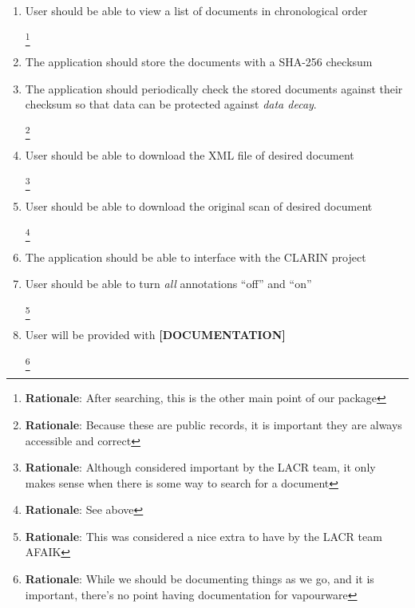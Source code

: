 \documentclass[10pt,a4paper]{report}
\newcommand{\rationale}[1]{
    \footnote{
        \textbf{Rationale}: #1
    }
}
\begin{document}
\begin{enumerate}
            \item User should be able to view a list of documents in chronological order 
            \rationale{After searching, this is the other main point of our package}
            
            \item The application should store the documents with a SHA-256 checksum
            \item The application should periodically check the stored documents against their checksum so that data can be protected against \emph{data decay}.
            \rationale{Because these are public records, it is important they are always accessible and correct}
            
            \item User should be able to download the XML file of desired document
            \rationale{Although considered important by the LACR team, it only makes sense when there is some way to search for a document}
            
            \item User should be able to download the original scan of desired document
            \rationale{See above}
            
            \item The application should be able to interface with the CLARIN project
            
            \item User should be able to turn \emph{all} annotations “off” and “on”
            \rationale{This was considered a nice extra to have by the LACR team AFAIK}
            
            \item User will be provided with \textbf{[DOCUMENTATION]}
            \rationale{While we should be documenting things as we go, and it is important, there's no point having documentation for vapourware}
        \end{enumerate}
\end{document}
